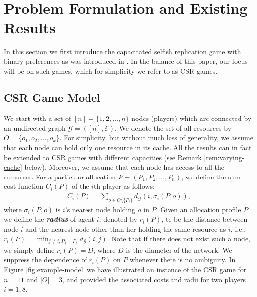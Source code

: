 \documentclass[conference, 10pt, twocolumn]{ieeeconf}
\newcounter{note}
\begin{document}
\section{Problem Formulation and Existing Results}\label{sec:game-model}

In this section we first introduce the capacitated selfish replication game with binary preferences as was introduced in \cite{gopalakrishnan2012cache}. In the balance of this paper, our focus will be on such games, which for simplicity we refer to as CSR games.

\subsection{CSR Game Model}
We start with a set of $[n]=\{1,2,\ldots,n\}$ nodes (players) which are connected by an undirected graph $\mathcal{G}=([n], \mathcal{E})$. We denote the set of all resources by $O=\{o_1, o_2,\ldots, o_k\}$. For simplicity, but without much loss of generality, we assume that each node can hold only one resource in its cache. All the results can in fact be extended to CSR games with different capacities (see Remark \ref{rem:varying-cache} below). Moreover, we assume that each node has access to all the resources. For a particular allocation $P=(P_1, P_2, \ldots, P_n)$, we define the sum cost function $C_i(P)$ of the $i$th player as follows:
\begin{align}\label{eq:CSR-cost-formulation}
C_i(P)=\sum_{o\in O\setminus \{P_i\}}d_{\mathcal{G}}(i, \sigma_i(P,o)), 
\end{align}
where $\sigma_i(P,o)$ is $i$'s nearest node holding $o$ in $P$. Given an allocation profile $P$ we define the {\bf\textit{radius}} of agent $i$, denoted by $r_i(P)$, to be the distance between node $i$ and the nearest node other than her holding the same resource as $i$, i.e., $r_i(P)=\min_{ j\neq i, P_j=P_i}d_{\mathcal{G}}(i,j)$. Note that if there does not exist such a node, we simply define $r_i(P)=D$, where $D$ is the diameter of the network. We suppress the dependence of $r_i(P)$ on $P$ whenever there is no ambiguity. In Figure \ref{fig:example-model} we have illustrated an instance of the CSR game for $n=11$ and $|O|=3$, and provided the associated costs and radii for two players $i=1,8$.
\end{document}

